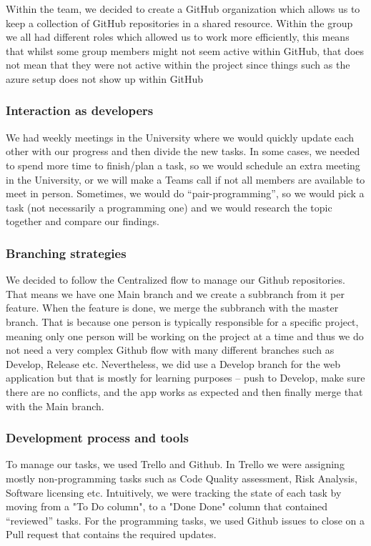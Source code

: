      Within the team, we decided to create a GitHub organization which allows us to keep a collection of GitHub repositories in a  shared resource. Within the group we all had different roles which allowed us to work more efficiently, this means that whilst some group members might not seem active within GitHub, that does not mean that they were not active within the project since things such as the azure setup does not show up within GitHub
     
     \subsubsection{Interaction as developers}
     We had weekly meetings in the University where we would quickly update each other with our progress and then divide the new tasks. In some cases, we needed to spend more time to finish/plan a task, so we would schedule an extra meeting in the University, or we will make a Teams call if not all members are available to meet in person. Sometimes, we would do “pair-programming”, so we would pick a task (not necessarily a programming one) and we would research the topic together and compare our findings. 
     
    \subsubsection{Branching strategies}
    We decided to follow the Centralized flow to manage our Github repositories. That means we have one Main branch and we create a subbranch from it per feature. When the feature is done, we merge the subbranch with the master branch. That is because one person is typically responsible for a specific project, meaning only one person will be working on the project at a time and thus we do not need a very complex Github flow with many different branches such as Develop, Release etc. Nevertheless, we did use a Develop branch for the web application but that is mostly for learning purposes – push to Develop, make sure there are no conflicts, and the app works as expected and then finally merge that with the Main branch.
    
    \subsubsection{Development process and tools}
    To manage our tasks, we used Trello and Github. In Trello we were assigning mostly non-programming tasks such as Code Quality assessment, Risk Analysis, Software licensing etc. Intuitively, we were tracking the state of each task by moving from a "To Do column", to a "Done Done" column that contained “reviewed” tasks. For the programming tasks, we used Github issues to close on a Pull request that contains the required updates. 
     
     